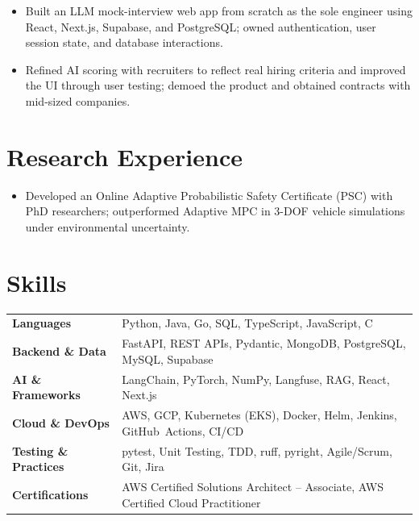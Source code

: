 \documentclass[11pt, letterpaper]{article}
\begin{document}
\begin{itemize}
  \item Built an LLM mock-interview web app from scratch as the sole engineer using React, Next.js, Supabase, and PostgreSQL; owned authentication, user session state, and database interactions.
  \item Refined AI scoring with recruiters to reflect real hiring criteria and improved the UI through user testing; demoed the product and obtained contracts with mid-sized companies.
\end{itemize}

\section{Research Experience}
\begin{itemize}
  \item Developed an Online Adaptive Probabilistic Safety Certificate (PSC) with PhD researchers; outperformed Adaptive MPC in 3-DOF vehicle simulations under environmental uncertainty.
\end{itemize}

\section{Skills}
\begin{tabularx}{\textwidth}{@{}l @{\hspace{7pt}} >{\raggedright\arraybackslash}X@{}}
  \textbf{Languages} & Python, Java, Go, SQL, TypeScript, JavaScript, C \\[1pt]
  \textbf{Backend \& Data} & FastAPI, REST APIs, Pydantic, MongoDB, PostgreSQL, MySQL, Supabase \\[1pt]
  \textbf{AI \& Frameworks} & LangChain, PyTorch, NumPy, Langfuse, RAG, React, Next.js \\[1pt]
  \textbf{Cloud \& DevOps} & AWS, GCP, Kubernetes (EKS), Docker, Helm, Jenkins, GitHub~Actions, CI/CD \\[1pt]
  \textbf{Testing \& Practices} & pytest, Unit Testing, TDD, ruff, pyright, Agile/Scrum, Git, Jira \\[1pt]
  \textbf{Certifications} & AWS Certified Solutions Architect -- Associate, AWS Certified Cloud Practitioner \\
\end{tabularx}
\end{document}
